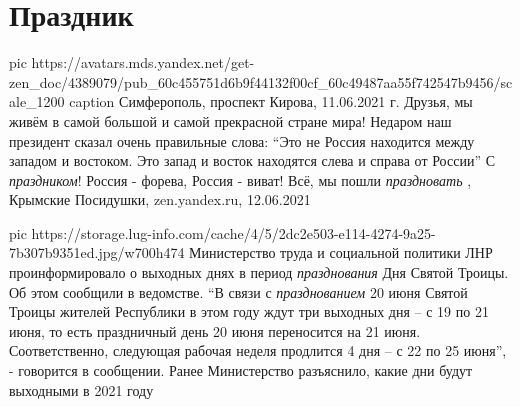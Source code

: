  
 
 
 
 
\chapter{Праздник}
\label{sec:slova.prazdnik}

\ifcmt
  pic https://avatars.mds.yandex.net/get-zen_doc/4389079/pub_60c455751d6b9f44132f00cf_60c49487aa55f742547b9456/scale_1200
	caption Симферополь, проспект Кирова, 11.06.2021 г.
\fi
Друзья, мы живём в самой большой и самой прекрасной стране мира!  Недаром наш
президент сказал очень правильные слова: \enquote{Это не Россия находится между
западом и востоком. Это запад и восток находятся слева и справа от России} С
\emph{праздником}! Россия - форева, Россия - виват! Всё, мы пошли
\emph{праздновать}
, 
Крымские Посидушки, zen.yandex.ru, 12.06.2021

\ifcmt
  pic https://storage.lug-info.com/cache/4/5/2dc2e503-e114-4274-9a25-7b307b9351ed.jpg/w700h474
\fi
Министерство труда и социальной политики ЛНР проинформировало о выходных днях в
период \emph{празднования} Дня Святой Троицы. Об этом сообщили в ведомстве.  \enquote{В связи
с \emph{празднованием} 20 июня Святой Троицы жителей Республики в этом году ждут три
выходных дня – с 19 по 21 июня, то есть праздничный день 20 июня переносится на
21 июня. Соответственно, следующая рабочая неделя продлится 4 дня – с 22 по 25
июня}, - говорится в сообщении.  Ранее Министерство разъяснило, какие дни будут
выходными в 2021 году
  


